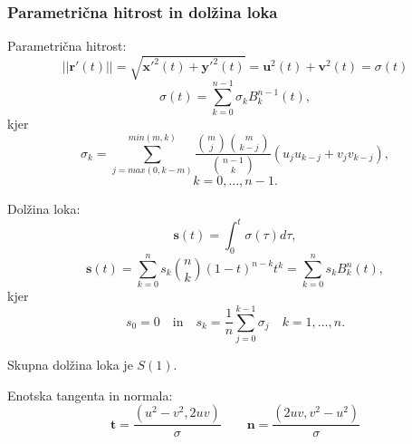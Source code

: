 \documentclass[12pt]{beamer}
\theoremstyle{definition} %
\theoremstyle{plain} %
\begin{document}
\begin{frame}
\frametitle{Parametrična hitrost in dolžina loka}
Parametrična hitrost:
$$ || \textbf{r}\prime (t) || =\sqrt{\textbf{x}\prime^2(t)+\textbf{y}\prime^2(t)}= \textbf{u}^2 (t) + \textbf{v}^2 (t) = \sigma (t)$$
$$\sigma (t) =\sum_{k=0}^{n-1} \sigma_kB_k^{n-1}(t),$$
	kjer  
$$\sigma_k =\sum_{j=max(0,k-m)}^{min(m,k)}\frac{\binom{m}{j}\binom{m}{k-j}}{\binom{n-1}{k}}(u_ju_{k-j}+v_jv_{k-j}),$$ $$k = 0,\ldots , n - 1.$$
\end{frame}
\begin{frame}
    Dolžina loka:
    $$\textbf{s}(t) =\int^t_0\sigma(\tau) d\tau,$$
    $$\textbf{s}(t) =\sum^n_{k=0}s_k\binom{n}{k}(1-t)^{n-k}t^k=\sum_{k=0}^n s_kB^n_k(t),$$
	kjer  $$s_0=0 \quad \text{in} \quad s_k=\frac{1}{n}\sum^{k-1}_{j=0}\sigma_j \quad k=1,\ldots,n.$$

    Skupna dolžina loka je $S(1)$. 
    \newline
    
    Enotska tangenta in normala:
    $$\textbf{t} =\frac{(u^2 - v^2, 2uv)}{\sigma} \quad \quad
     \textbf{n} =\frac{(2uv, v^2 - u^2)}{\sigma}$$
\end{frame}
	
\end{document}
